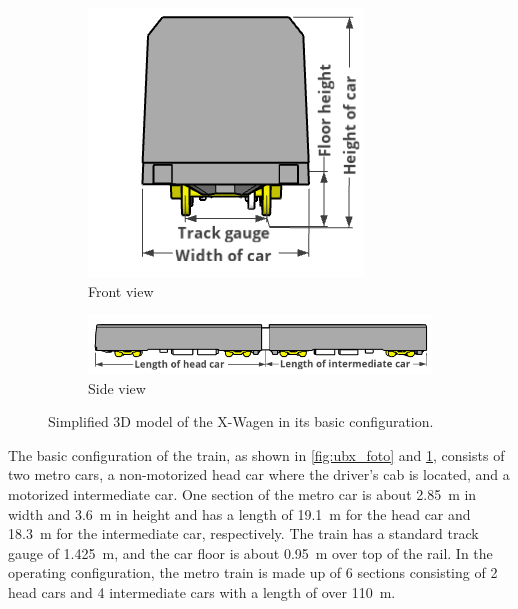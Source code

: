 \begin{figure}[H]
	\centering
	\begin{subfigure}[b]{\textwidth}
		\centering
		\includegraphics{fig/UBX_front_view_with_label_smaller.PNG}
		\caption{Front view}
	\end{subfigure}

	\begin{subfigure}[b]{\textwidth}
		\centering
		\includegraphics{fig/UBX_sketchup_model_side_view_with_label_2.PNG}
		\caption{Side view}
		\label{fig:ubx_model_sideview}
	\end{subfigure}
	
	\caption{Simplified 3D model of the X-Wagen in its basic configuration.}
	\label{fig:ubx_sketup_model}
\end{figure}

The basic configuration of the train, as shown in \cref{fig:ubx_foto} and \cref{fig:ubx_model_sideview}, consists of two metro cars, a non-motorized head car where the driver's cab is located, and a motorized intermediate car. One section of the metro car is about \SI{2.85}{\meter} in width and \SI{3.6}{\meter} in height and has a length of \SI{19.1}{\meter} for the head car and \SI{18.3}{\meter} for the intermediate car, respectively. The train has a standard track gauge of \SI{1.425}{\meter}, and the car floor is about \SI{0.95}{\meter} over top of the rail. In the operating configuration, the metro train is made up of 6 sections consisting of 2 head cars and 4 intermediate cars with a length of over \SI{110}{\meter}.

